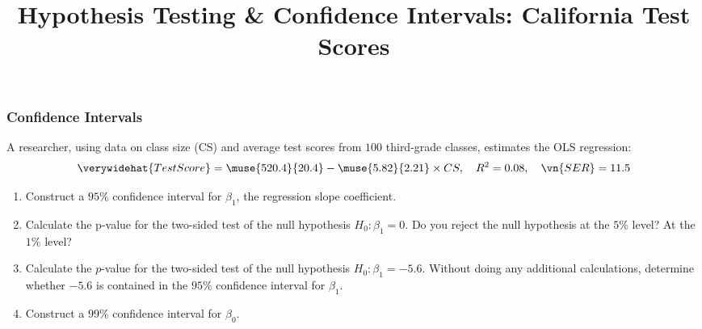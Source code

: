 \title[Weight]{Hypothesis Testing \& Confidence Intervals: California Test Scores}
\date{}







\def\ask{\begin{align*}
\verywidehat{TestScore} 
  = \muse{520.4}{20.4} - \muse{5.82}{2.21} \times CS,
  \quad R^2 = 0.08,
  \quad \vn{SER} = 11.5
\end{align*}}


\begin{frame}
\frametitle{Confidence Intervals}
A researcher, using data on class size (CS) and average test scores from $100$ third-grade classes, estimates the OLS regression:
\ask
\begin{enumerate}
\item Construct a $95\%$ confidence interval for $\beta_1$, the regression slope coefficient.
\item Calculate the p-value for the two-sided test of the null hypothesis
$H_0\colon \beta_1 = 0$. Do you reject the null hypothesis at the $5\%$ level? At the $1\%$ level?
\item Calculate the $p$-value for the two-sided test of the null hypothesis $H_{0}\colon\beta_{1}=-5.6$. Without doing any additional calculations, determine whether $-5.6$ is contained in the $95\%$ confidence interval for $\beta_{1}$.
\item Construct a $99\%$ confidence interval for $\beta_{0}$.
\end{enumerate}
\end{frame}


